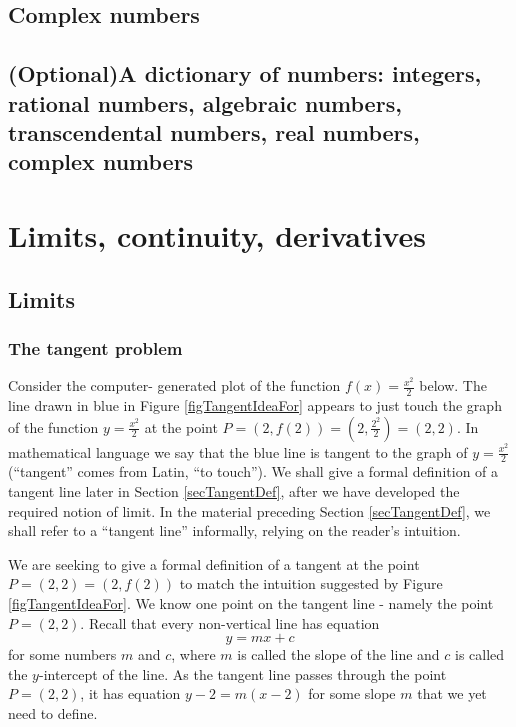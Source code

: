 \documentclass[12pt]{book}
\newcommand{\optionalMaterial}{\textbf{(Optional)}}
\begin{document}
\section{ Complex numbers}
\section{\optionalMaterial A dictionary of numbers: integers, rational numbers, algebraic numbers, transcendental numbers, real numbers, complex numbers}

\chapter{Limits, continuity, derivatives}
\section{Limits}
\subsection{The tangent problem}
Consider the computer- generated plot of the function $f(x)=\frac{x^2}2$ below. The line drawn in blue in Figure \ref{figTangentIdeaFor} appears to just touch the graph of the function $y=\frac{x^2}2$ at the point $P=(2,f(2))=(2, \frac{2^2}{2}) =(2,2)$. In mathematical language we say that the blue line is tangent to the graph of $ y=\frac{x^2}2$ (``tangent'' comes from Latin, ``to touch''). We shall give a formal definition of a tangent line later in Section \ref{secTangentDef}, after we have developed the required notion of limit. In the material preceding Section \ref{secTangentDef}, we shall refer to a ``tangent line'' informally, relying on the reader's intuition.

We are seeking to give a formal definition of a tangent at the point $P=(2,2)=(2, f(2))$ to match the intuition suggested by Figure \ref{figTangentIdeaFor}. We know one point on the tangent line - namely the point $P=(2,2)$. Recall that every non-vertical line has equation 
\[
y=mx+c
\]
for some numbers $m$ and $c$, where $m$ is called the slope
of the line and $c$ is called the $y$-intercept of the line. As the tangent line passes through the point $P=(2,2)$, it has equation $y-2=m(x-2)$ for some slope $m$ that we yet need to define. 
\end{document}
